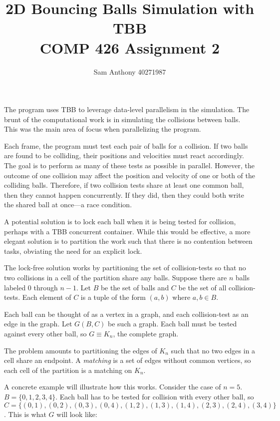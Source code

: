 \documentclass{article}
\title{2D Bouncing Balls Simulation with TBB\\
\large COMP 426 Assignment 2}
\author{Sam Anthony 40271987}
\begin{document}
\maketitle

The program uses TBB to leverage data-level parallelism in the simulation.
The brunt of the computational work is in simulating the collisions between balls.
This was the main area of focus when parallelizing the program.

Each frame, the program must test each pair of balls for a collision.
If two balls are found to be colliding, their positions and velocities must react accordingly.
The goal is to perform as many of these tests as possible in parallel.
However, the outcome of one collision may affect the position and velocity of one or both of the colliding balls.
Therefore, if two collision tests share at least one common ball, then they cannot happen concurrently.
If they did, then they could both write the shared ball at once---a race condition.

A potential solution is to lock each ball when it is being tested for collision, perhaps with a TBB concurrent container.
While this would be effective, a more elegant solution is to partition the work such that there is no contention between tasks, obviating the need for an explicit lock.

The lock-free solution works by partitioning the set of collision-tests so that no two collisions in a cell of the partition share any balls.
Suppose there are $n$ balls labeled 0 through $n-1$.
Let $B$ be the set of balls and $C$ be the set of all collision-tests.
Each element of $C$ is a tuple of the form $(a, b)$ where $a,b \in B$.

Each ball can be thought of as a vertex in a graph, and each collision-test as an edge in the graph.
Let $G(B, C)$ be such a graph.
Each ball must be tested against every other ball, so $G \equiv K_n$, the complete graph.

The problem amounts to partitioning the edges of $K_n$ such that no two edges in a cell share an endpoint.
A \emph{matching} is a set of edges without common vertices, so each cell of the partition is a matching on $K_n$.

A concrete example will illustrate how this works.
Consider the case of $n = 5$.
$B = \{0, 1, 2, 3, 4\}$.
Each ball has to be tested for collision with every other ball, so $C = \{(0, 1), (0, 2), (0, 3), (0, 4), (1, 2), (1, 3), (1, 4), (2, 3), (2, 4), (3, 4)\}$.
This is what $G$ will look like:
\end{document}
